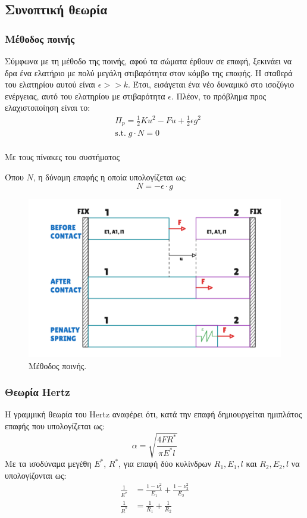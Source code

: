 \documentclass{article}
\begin{document}
\subsection{Συνοπτική θεωρία}
\subsubsection{Μέθοδος ποινής}
Σύμφωνα με τη μέθοδο της ποινής, αφού τα σώματα έρθουν σε επαφή, ξεκινάει να δρα ένα ελατήριο με πολύ μεγάλη στιβαρότητα στον κόμβο της επαφής. Η σταθερά του ελατηρίου αυτού είναι $\epsilon >> k$. Έτσι, εισάγεται ένα νέο δυναμικό στο ισοζύγιο ενέργειας, αυτό του ελατηρίου με στιβαρότητα $\epsilon$. Πλέον, το πρόβλημα προς ελαχιστοποίηση είναι το:
 \begin{align}
    &\Pi_p = \frac{1}{2}Ku^2 - F u + \frac{1}{2}\epsilon g ^2\\
    &\text{s.t.}\;  g\cdot N = 0\\
\end{align}

Με τους πίνακες του συστήματος

Όπου $N$, η δύναμη επαφής η οποία υπολογίζεται ως:
\begin{equation}
    N = -\epsilon \cdot g
\end{equation}

\begin{figure}[H]
    \centering
    \includegraphics[width=0.6\linewidth]{media/pen.png}
    \caption{Μέθοδος ποινής.}
    \label{fig:pen}
\end{figure}



\subsubsection{Θεωρία Hertz}
Η γραμμική θεωρία του Hertz αναφέρει ότι, κατά την επαφή δημιουργείται ημιπλάτος επαφής που υπολογίζεται ως:
\begin{equation}
    \alpha = \sqrt{\frac{4 F R^*}{\pi E^* l}}
\end{equation}
Με τα ισοδύναμα μεγέθη $Ε^*$, $R^*$, για επαφή δύο κυλίνδρων $R_1, E_1, l$ και $R_2, E_2, l$ να υπολογίζονται ως:
\begin{align}
    \frac{1}{E^*} & = \frac{1-\nu_1^2}{E_1} + \frac{1-\nu_2^2}{E_2} \\
    \frac{1}{R^*} &= \frac{1}{R_1} + \frac{1}{R_2} 
\end{align}
\end{document}
